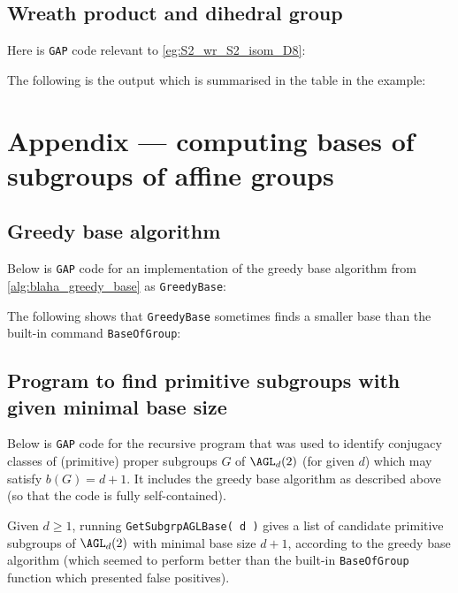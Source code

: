 \section{Wreath product and dihedral group}

Here is \texttt{GAP} code relevant to \autoref{eg:S2_wr_S2_isom_D8}:



The following is the output which is summarised in the table in the example:



\chapter{Appendix --- computing bases of subgroups of affine groups}%

\section{Greedy base algorithm}

Below is \texttt{GAP} code for an implementation of the greedy base algorithm from \autoref{alg:blaha_greedy_base} as \texttt{GreedyBase}:\label{app:greedy_base}



The following shows that \texttt{GreedyBase} sometimes finds a smaller base than the built-in command \texttt{BaseOfGroup}:\label{app:greedy_better_than_default}



\section{Program to find primitive subgroups with given minimal base size}

Below is \texttt{GAP} code for the recursive program that was used to identify conjugacy classes of (primitive) proper subgroups $G$ of $\AGL_d(2)$ (for given $d$) which may satisfy $b(G) = d + 1$. It includes the greedy base algorithm as described above (so that the code is fully self-contained).

Given $d \geq 1$, running \texttt{GetSubgrpAGLBase( d )} gives a list of candidate primitive subgroups of $\AGL_d(2)$ with minimal base size $d + 1$, according to the greedy base algorithm (which seemed to perform better than the built-in \texttt{BaseOfGroup} function which presented false positives).

